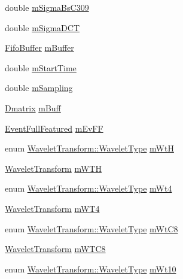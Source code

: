\begin{DoxyCompactItemize}
double \hyperlink{classtsa_1_1_w_d_f2_classify_a2ec13dd4aa8e12b1d26b16067c7028b1}{m\+Sigma\+Bs\+C309}
\item 
double \hyperlink{classtsa_1_1_w_d_f2_classify_a9df97d5cf9e81798c79e92e47c9aac2e}{m\+Sigma\+D\+CT}
\item 
\hyperlink{classtsa_1_1_fifo_buffer}{Fifo\+Buffer} \hyperlink{classtsa_1_1_w_d_f2_classify_abbaaaa7ad220ba5b3a2bb63b7294a113}{m\+Buffer}
\item 
double \hyperlink{classtsa_1_1_w_d_f2_classify_a7f025cb0556b8e15d16889c741431caf}{m\+Start\+Time}
\item 
double \hyperlink{classtsa_1_1_w_d_f2_classify_ac56cfaa6f0a904d5f15e916c3646ddfc}{m\+Sampling}
\item 
\hyperlink{namespacetsa_ad260cd21c1891c4ed391fe788569aba4}{Dmatrix} \hyperlink{classtsa_1_1_w_d_f2_classify_a0fec828c6f0668c1e7df1adb72e36f75}{m\+Buff}
\item 
\hyperlink{classtsa_1_1_event_full_featured}{Event\+Full\+Featured} \hyperlink{classtsa_1_1_w_d_f2_classify_aeb84c3ffdea9f78af3d4f83461f806ab}{m\+Ev\+FF}
\item 
enum \hyperlink{classtsa_1_1_wavelet_transform_a5a529de70e0004333fcf23b9cca88ce7}{Wavelet\+Transform\+::\+Wavelet\+Type} \hyperlink{classtsa_1_1_w_d_f2_classify_af6eb80034fbf746a2b9518345616407e}{m\+WtH}
\item 
\hyperlink{classtsa_1_1_wavelet_transform}{Wavelet\+Transform} \hyperlink{classtsa_1_1_w_d_f2_classify_a57dc2b30913652447a8abd4c1ac7fb0f}{m\+W\+TH}
\item 
enum \hyperlink{classtsa_1_1_wavelet_transform_a5a529de70e0004333fcf23b9cca88ce7}{Wavelet\+Transform\+::\+Wavelet\+Type} \hyperlink{classtsa_1_1_w_d_f2_classify_a209bba3065cf607d1ecc47d4d599d139}{m\+Wt4}
\item 
\hyperlink{classtsa_1_1_wavelet_transform}{Wavelet\+Transform} \hyperlink{classtsa_1_1_w_d_f2_classify_acb6943d4b183f37e6a6f236d7d6c2484}{m\+W\+T4}
\item 
enum \hyperlink{classtsa_1_1_wavelet_transform_a5a529de70e0004333fcf23b9cca88ce7}{Wavelet\+Transform\+::\+Wavelet\+Type} \hyperlink{classtsa_1_1_w_d_f2_classify_a3a1938c2a75205c988fc0b199d248b05}{m\+Wt\+C8}
\item 
\hyperlink{classtsa_1_1_wavelet_transform}{Wavelet\+Transform} \hyperlink{classtsa_1_1_w_d_f2_classify_acdb5794a62be9190bf8e495b13b6a79f}{m\+W\+T\+C8}
\item 
enum \hyperlink{classtsa_1_1_wavelet_transform_a5a529de70e0004333fcf23b9cca88ce7}{Wavelet\+Transform\+::\+Wavelet\+Type} \hyperlink{classtsa_1_1_w_d_f2_classify_a17b190834294293f935a8ff2baf96a2f}{m\+Wt10}

\end{DoxyCompactItemize}
